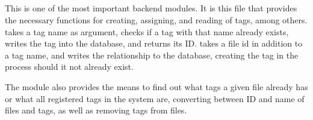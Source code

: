 \subsection{}
\def\kapitelautor{Erik Ritschl}

This is one of the most important backend modules. It is this file that provides the necessary functions for creating, assigning, and reading of tags, among others.  takes a tag name as argument, checks if a tag with that name already exists, writes the tag into the database, and returns its ID.  takes a file id in addition to a tag name, and writes the relationship to the database, creating the tag in the process should it not already exist. 

The module also provides the means to find out what tags a given file already has or what all registered tags in the system are, converting between ID and name of files and tags, as well as removing tags from files.

